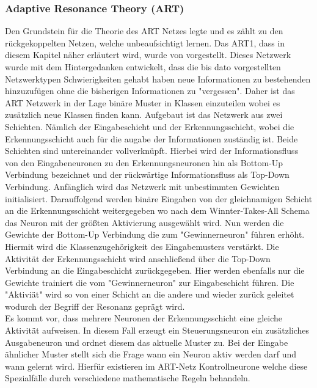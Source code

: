 \subsubsection{Adaptive Resonance Theory (ART)}%

Den Grundstein für die Theorie des ART Netzes legte \citet{Grossberg1973} und es zählt zu den rückgekoppelten Netzen, welche unbeaufsichtigt lernen. Das ART1, dass in diesem Kapitel näher erläutert wird, wurde von \citet{Carpenter1987} vorgestellt. Dieses Netzwerk wurde mit dem Hintergedanken entwickelt, dass die bis dato vorgestellten Netzwerktypen Schwierigkeiten gehabt haben neue Informationen zu bestehenden hinzuzufügen ohne die bisherigen Informationen zu "vergessen". Daher ist das ART Netzwerk in der Lage binäre Muster in Klassen einzuteilen wobei es zusätzlich neue Klassen finden kann. Aufgebaut ist das Netzwerk aus zwei Schichten. Nämlich der Eingabeschicht und der Erkennungsschicht, wobei die Erkennungsschicht auch für die augabe der Informationen zuständig ist. Beide Schichten sind untereinander vollverknüpft. Hierbei wird der Informationsfluss von den Eingabeneuronen zu den Erkennungsneuronen hin als Bottom-Up Verbindung bezeichnet und der rückwärtige Informationsfluss als Top-Down Verbindung. Anfänglich wird das Netzwerk mit unbestimmten Gewichten initialisiert. Darauffolgend werden binäre Eingaben von der gleichnamigen Schicht an die Erkennungsschicht weitergegeben wo nach dem Winnter-Takes-All Schema das Neuron mit der größten Aktivierung ausgewählt wird. Nun werden die Gewichte der Bottom-Up Verbindung die zum "Gewinnerneuron" führen erhöht. Hiermit wird die Klassenzugehörigkeit des Eingabemusters verstärkt. Die Aktivität der Erkennungsschicht wird anschließend über die Top-Down Verbindung an die Eingabeschicht zurückgegeben. Hier werden ebenfalls nur die Gewichte trainiert die vom "Gewinnerneuron" zur Eingabeschicht führen. Die "Aktiviät" wird so von einer Schicht an die andere und wieder zurück geleitet wodurch der Begriff der Resonanz geprägt wird.\\
Es kommt vor, dass mehrere Neuronen der Erkennungsschicht eine gleiche Aktivität aufweisen. In diesem Fall erzeugt ein Steuerungsneuron ein zusätzliches Ausgabeneuron und ordnet diesem das aktuelle Muster zu. Bei der Eingabe ähnlicher Muster stellt sich die Frage wann ein Neuron aktiv werden darf und wann gelernt wird. Hierfür existieren im ART-Netz Kontrollneurone welche diese Spezialfälle durch verschiedene mathematische Regeln behandeln.\\
